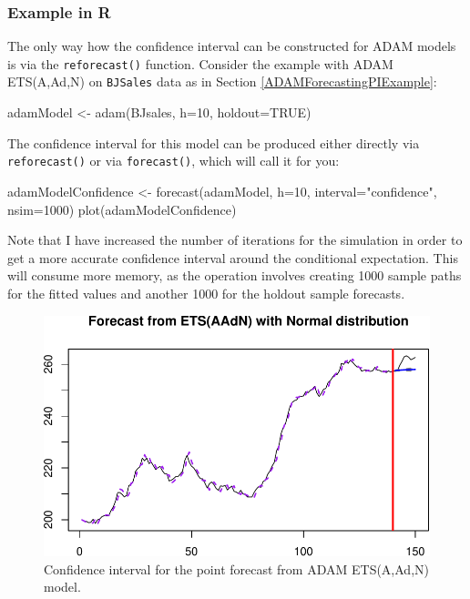 \documentclass[
]{book}
\newenvironment{Shaded}{\begin{snugshade}}{\end{snugshade}}
\newcommand{\AttributeTok}[1]{\textcolor[rgb]{0.77,0.63,0.00}{#1}}
\newcommand{\ConstantTok}[1]{\textcolor[rgb]{0.00,0.00,0.00}{#1}}
\newcommand{\DecValTok}[1]{\textcolor[rgb]{0.00,0.00,0.81}{#1}}
\newcommand{\FunctionTok}[1]{\textcolor[rgb]{0.00,0.00,0.00}{#1}}
\newcommand{\NormalTok}[1]{#1}
\newcommand{\OtherTok}[1]{\textcolor[rgb]{0.56,0.35,0.01}{#1}}
\newcommand{\StringTok}[1]{\textcolor[rgb]{0.31,0.60,0.02}{#1}}
\theoremstyle{definition}
\theoremstyle{definition}
\theoremstyle{definition}
\theoremstyle{definition}
\theoremstyle{remark}
\begin{document}
\hypertarget{example-in-r-1}{%
\subsubsection{Example in R}\label{example-in-r-1}}

The only way how the confidence interval can be constructed for ADAM models is via the \texttt{reforecast()} function. Consider the example with ADAM ETS(A,Ad,N) on \texttt{BJSales} data as in Section \ref{ADAMForecastingPIExample}:

\begin{Shaded}
\begin{Highlighting}[]
\NormalTok{adamModel }\OtherTok{\textless{}{-}} \FunctionTok{adam}\NormalTok{(BJsales, }\AttributeTok{h=}\DecValTok{10}\NormalTok{, }\AttributeTok{holdout=}\ConstantTok{TRUE}\NormalTok{)}
\end{Highlighting}
\end{Shaded}

The confidence interval for this model can be produced either directly via \texttt{reforecast()} or via \texttt{forecast()}, which will call it for you:

\begin{Shaded}
\begin{Highlighting}[]
\NormalTok{adamModelConfidence }\OtherTok{\textless{}{-}} \FunctionTok{forecast}\NormalTok{(adamModel, }\AttributeTok{h=}\DecValTok{10}\NormalTok{,}
                                \AttributeTok{interval=}\StringTok{"confidence"}\NormalTok{, }\AttributeTok{nsim=}\DecValTok{1000}\NormalTok{)}
\FunctionTok{plot}\NormalTok{(adamModelConfidence)}
\end{Highlighting}
\end{Shaded}

Note that I have increased the number of iterations for the simulation in order to get a more accurate confidence interval around the conditional expectation. This will consume more memory, as the operation involves creating 1000 sample paths for the fitted values and another 1000 for the holdout sample forecasts.

\begin{figure}
\centering
\includegraphics{adam_files/figure-latex/adamModelConfidence-1.pdf}
\caption{\label{fig:adamModelConfidence}Confidence interval for the point forecast from ADAM ETS(A,Ad,N) model.}
\end{figure}
\end{document}
